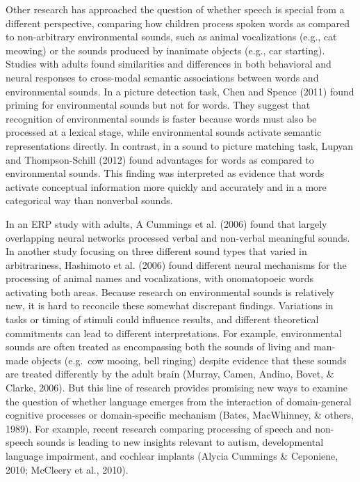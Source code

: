 \documentclass[english,floatsintext,man]{apa6}
\theoremstyle{definition}
\theoremstyle{definition}
\theoremstyle{definition}
\theoremstyle{remark}
\begin{document}
Other research has approached the question of whether speech is special
from a different perspective, comparing how children process spoken
words as compared to non-arbitrary environmental sounds, such as animal
vocalizations (e.g., cat meowing) or the sounds produced by inanimate
objects (e.g., car starting). Studies with adults found similarities and
differences in both behavioral and neural responses to cross-modal
semantic associations between words and environmental sounds. In a
picture detection task, Chen and Spence (2011) found priming for
environmental sounds but not for words. They suggest that recognition of
environmental sounds is faster because words must also be processed at a
lexical stage, while environmental sounds activate semantic
representations directly. In contrast, in a sound to picture matching
task, Lupyan and Thompson-Schill (2012) found advantages for words as
compared to environmental sounds. This finding was interpreted as
evidence that words activate conceptual information more quickly and
accurately and in a more categorical way than nonverbal sounds.

In an ERP study with adults, A Cummings et al. (2006) found that largely
overlapping neural networks processed verbal and non-verbal meaningful
sounds. In another study focusing on three different sound types that
varied in arbitrariness, Hashimoto et al. (2006) found different neural
mechanisms for the processing of animal names and vocalizations, with
onomatopoeic words activating both areas. Because research on
environmental sounds is relatively new, it is hard to reconcile these
somewhat discrepant findings. Variations in tasks or timing of stimuli
could influence results, and different theoretical commitments can lead
to different interpretations. For example, environmental sounds are
often treated as encompassing both the sounds of living and man-made
objects (e.g.~cow mooing, bell ringing) despite evidence that these
sounds are treated differently by the adult brain (Murray, Camen,
Andino, Bovet, \& Clarke, 2006). But this line of research provides
promising new ways to examine the question of whether language emerges
from the interaction of domain-general cognitive processes or
domain-specific mechanism (Bates, MacWhinney, \& others, 1989). For
example, recent research comparing processing of speech and non-speech
sounds is leading to new insights relevant to autism, developmental
language impairment, and cochlear implants (Alycia Cummings \&
Ceponiene, 2010; McCleery et al., 2010).
\end{document}
